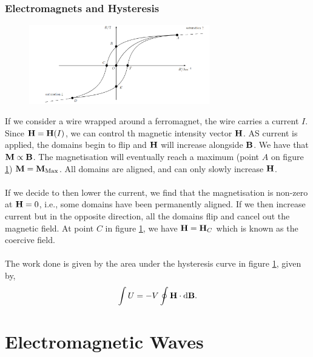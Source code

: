 \documentclass{book}
\begin{document}
\subsection{Electromagnets and Hysteresis}
\begin{figure}
	\centering
	\includegraphics[width=0.7\textwidth]{B-H graph.png}
	\caption{}
	\label{fig:bhgraph}
\end{figure}
If we consider a wire wrapped around a ferromagnet, the wire carries a current $I$. Since $\vb{H} = \vb{H}(I)$, we can control th magnetic intensity vector $\vb{H}$. AS current is applied, the domains begin to flip and $\vb{H}$ will increase alongside $\vb{B}$. We have that $\vb{M} \propto \vb{B}$. The magnetisation will eventually reach a maximum (point $A$ on figure \ref{fig:bhgraph}) $\vb{M} = \vb{M}_{\text{Max}}$. All domains are aligned, and can only slowly increase $\vb{H}$.
\\\\
If we decide to then lower the current, we find that the magnetisation is non-zero at $\vb{H} = 0$, i.e., some domains have been permanently aligned. If we then increase current but in the opposite direction, all the domains flip and cancel out the magnetic field. At point $C$ in figure \ref{fig:bhgraph}, we have $\vb{H} = \vb{H}_C$ which is known as the coercive field. 
\\\\
The work done is given by the area under the hysteresis curve in figure \ref{fig:bhgraph}, given by,
\begin{equation}
	\int U = -V \oint \vb{H} \cdot{\dd{\vb{B}}}.
\end{equation} 
\chapter{Electromagnetic Waves} 
\end{document}
